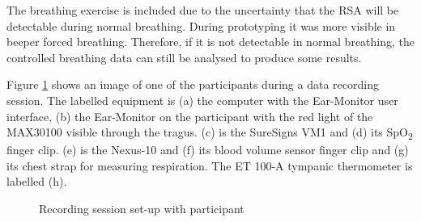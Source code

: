 The breathing exercise is included due to the uncertainty that the RSA will be detectable during normal breathing. During prototyping it was more visible in beeper forced breathing. Therefore, if it is not detectable in normal breathing, the controlled breathing data can still be analysed to produce some results. 

\medskip

Figure \ref{fig:TrialPhoto} shows an image of one of the participants during a data recording session. The labelled equipment is (a) the computer with the Ear-Monitor user interface, (b) the Ear-Monitor on the participant with the red light of the MAX30100 visible through the tragus. (c) is the SureSigns VM1 and (d) its SpO\textsubscript{2} finger clip. (e) is the Nexus-10 and (f) its blood volume sensor finger clip and (g) its chest strap for measuring respiration. The ET 100-A tympanic thermometer is labelled (h).

\begin{figure}[H]
\centering
\graphicspath{{figs/}}

\caption{Recording session set-up with participant}
\label{fig:TrialPhoto}
\end{figure}

